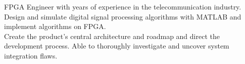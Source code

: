 \setcounter{experience_years}{\year}
\addtocounter{experience_years}{-2013}

\par{
    FPGA Engineer with \the\value{experience_years}{\small +} years of experience
    in the telecommunication industry. Design and simulate digital signal processing
    algorithms with MATLAB and implement algorithms on FPGA.\\
    Create the product's central architecture and roadmap and direct the development process.
    Able to thoroughly investigate and uncover system integration flaws.
}
